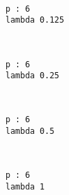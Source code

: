 \documentclass[11pt]{article}
\begin{document}
    \begin{center}
    \end{center}
    { \hspace*{\fill} \\}
    
    \begin{Verbatim}[commandchars=\\\{\}]
p : 6
lambda 0.125

    \end{Verbatim}

    \begin{center}
    \end{center}
    { \hspace*{\fill} \\}
    
    \begin{Verbatim}[commandchars=\\\{\}]
p : 6
lambda 0.25

    \end{Verbatim}

    \begin{center}
    \end{center}
    { \hspace*{\fill} \\}
    
    \begin{Verbatim}[commandchars=\\\{\}]
p : 6
lambda 0.5

    \end{Verbatim}

    \begin{center}
    \end{center}
    { \hspace*{\fill} \\}
    
    \begin{Verbatim}[commandchars=\\\{\}]
p : 6
lambda 1

    \end{Verbatim}

    \begin{center}
    \end{center}
    { \hspace*{\fill} \\}
    
\end{document}

